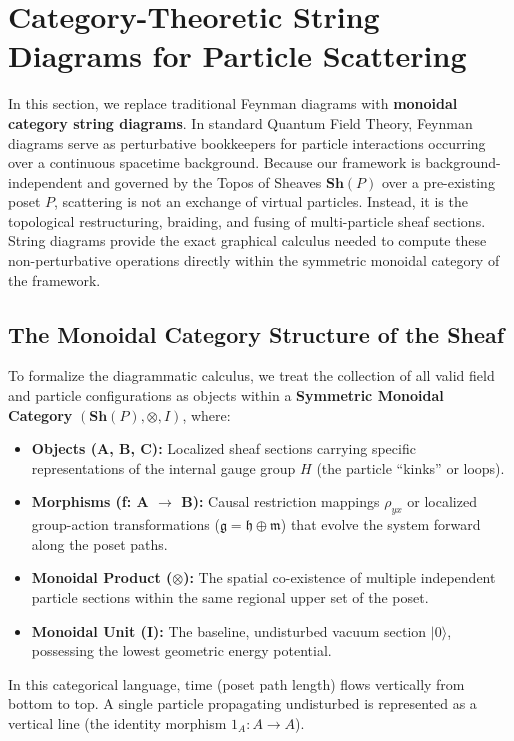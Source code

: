 \documentclass[12pt,letterpaper]{article}
\begin{document}
\section{Category-Theoretic String Diagrams for Particle Scattering}

In this section, we replace traditional Feynman diagrams with \textbf{monoidal category string diagrams}. In standard Quantum Field Theory, Feynman diagrams serve as perturbative bookkeepers for particle interactions occurring over a continuous spacetime background. Because our framework is background-independent and governed by the Topos of Sheaves $\mathbf{Sh}(P)$ over a pre-existing poset $P$, scattering is not an exchange of virtual particles. Instead, it is the topological restructuring, braiding, and fusing of multi-particle sheaf sections. String diagrams provide the exact graphical calculus needed to compute these non-perturbative operations directly within the symmetric monoidal category of the framework.

\subsection{The Monoidal Category Structure of the Sheaf}
To formalize the diagrammatic calculus, we treat the collection of all valid field and particle configurations as objects within a \textbf{Symmetric Monoidal Category} $(\mathbf{Sh}(P), \otimes, I)$, where:
\begin{itemize}
    \item \textbf{Objects (A, B, C):} Localized sheaf sections carrying specific representations of the internal gauge group $H$ (the particle ``kinks'' or loops).
    \item \textbf{Morphisms (f: A $\to$ B):} Causal restriction mappings $\rho_{yx}$ or localized group-action transformations ($\mathfrak{g} = \mathfrak{h} \oplus \mathfrak{m}$) that evolve the system forward along the poset paths.
    \item \textbf{Monoidal Product ($\otimes$):} The spatial co-existence of multiple independent particle sections within the same regional upper set of the poset.
    \item \textbf{Monoidal Unit (I):} The baseline, undisturbed vacuum section $|0\rangle$, possessing the lowest geometric energy potential.
\end{itemize}

In this categorical language, time (poset path length) flows vertically from bottom to top. A single particle propagating undisturbed is represented as a vertical line (the identity morphism $1_A: A \to A$).
\end{document}
